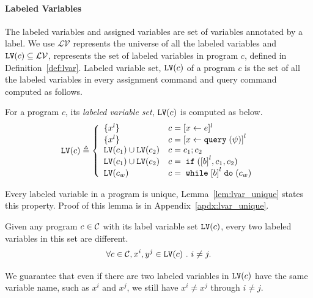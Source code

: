 \paragraph{Labeled Variables}
The labeled variables and assigned variables are set of variables annotated by a label. 
We use 
$\mathcal{LV}$ represents the universe of all the labeled variables and 
$\mathtt{LV}(c) \subseteq \mathcal{LV}$,
represents the set of labeled variables in program $c$,
defined in Definition~\ref{def:lvar}.
Labeled variable set, $\mathtt{LV}(c)$ of a program $c$ is the set of all the labeled variables in every assignment command
and query command computed as follows.
%
\begin{defn}
 \label{def:lvar}
For a program $c$, its \emph{labeled variable set}, $\mathtt{LV}(c)$ is computed as below.
 {
 \[
 \lvar(c) \triangleq
 \left\{
 \begin{array}{ll}
 \{{x}^l\} 
 & {c} = [{\assign x e}]^{l} 
 \\
 \{{x}^l\} 
 & {c} = \clabel{\assign x \query(\qexpr)}^{l} 
 \\
 \lvar(c_1) \cup \lvar(c_2) 
 & {c} = {c_1};{c_2}
 \\
 \lvar(c_1) \cup \lvar(c_2)
 & {c} =\eif(\clabel{\bexpr}^{l}, c_1, c_2) 
 \\
 \lvar(c_w)
 & {c} = \ewhile \clabel{\bexpr}^{l} \edo (c_w)
 \end{array}
 \right.
 \]
 }
 \end{defn}
%

%
%
Every labeled variable in a program is unique, 
Lemma~\ref{lem:lvar_unique} states this property.
Proof of this lemma is in Appendix~\ref{apdx:lvar_unique}.
\begin{lem}
 \label{lem:lvar_unique}
 Given any program $c \in \mathcal{C}$ with its label variable set $\mathtt{LV}(c)$,
 every two labeled variables in this set are different.
 \[
 \forall c \in \mathcal{C}, x^i, y^j \in \mathtt{LV}(c) ~.~ i \neq j.
 \]
\end{lem}
We guarantee that even if there are two labeled variables in $\mathtt{LV}(c)$ have the same variable name,
such as $x^i$ and $x^j$, we still have $x^i \neq x^j$ through $i \neq j$.

